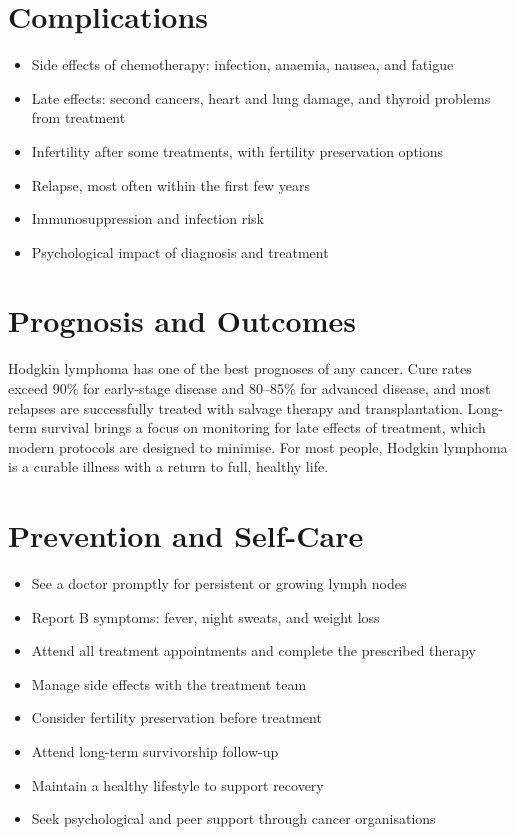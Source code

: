 \section*{Complications}
\begin{itemize}
    \item Side effects of chemotherapy: infection, anaemia, nausea, and fatigue
    \item Late effects: second cancers, heart and lung damage, and thyroid problems from treatment
    \item Infertility after some treatments, with fertility preservation options
    \item Relapse, most often within the first few years
    \item Immunosuppression and infection risk
    \item Psychological impact of diagnosis and treatment
\end{itemize}

\section*{Prognosis and Outcomes}
Hodgkin lymphoma has one of the best prognoses of any cancer. Cure rates exceed 90\% for early-stage disease and 80--85\% for advanced disease, and most relapses are successfully treated with salvage therapy and transplantation. Long-term survival brings a focus on monitoring for late effects of treatment, which modern protocols are designed to minimise. For most people, Hodgkin lymphoma is a curable illness with a return to full, healthy life.

\section*{Prevention and Self-Care}
\begin{itemize}
    \item See a doctor promptly for persistent or growing lymph nodes
    \item Report B symptoms: fever, night sweats, and weight loss
    \item Attend all treatment appointments and complete the prescribed therapy
    \item Manage side effects with the treatment team
    \item Consider fertility preservation before treatment
    \item Attend long-term survivorship follow-up
    \item Maintain a healthy lifestyle to support recovery
    \item Seek psychological and peer support through cancer organisations
\end{itemize}

